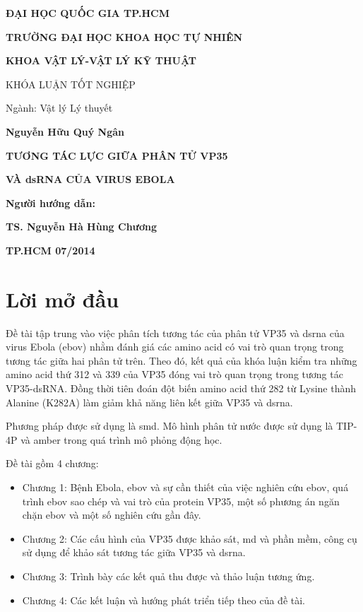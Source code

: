 \documentclass[12pt,a4paper,reqno, oneside]{book}
\begin{document}
\newpage
\begin{titlepage}
\centerline{\bf ĐẠI HỌC QUỐC GIA TP.HCM}
\centerline{\bf TRƯỜNG ĐẠI HỌC KHOA HỌC TỰ NHIÊN}
\centerline{\bf KHOA VẬT LÝ-VẬT LÝ KỸ THUẬT}
\vspace*{1cm}
\centerline{KHÓA LUẬN TỐT NGHIỆP}
\centerline{Ngành: Vật lý Lý thuyết}
\vspace*{1cm}
\centerline{\bf Nguyễn Hữu Quý Ngân}
\vspace*{3cm}
\centerline{\Large\bf TƯƠNG TÁC LỰC GIỮA PHÂN TỬ VP35}
\vspace*{0.5cm}
\centerline{\Large\bf VÀ dsRNA CỦA VIRUS EBOLA}
\vspace*{4cm}
\centerline{\bf Người hướng dẫn: }
\centerline{\bf TS. Nguyễn Hà Hùng Chương}
\vfill
\centerline{\bf TP.HCM 07/2014}
\end{titlepage}

\pagestyle{plain}
%

\cleardoublepage%
\pagestyle{fancy}
\tableofcontents
\clearpage

\printglossaries
{}
\clearpage

\newpage
\pagestyle{fancy}
\listoffigures



\newpage
\pagestyle{fancy}
\setcounter{page}{1}
\setcounter{chapter}{-1}
\chapter{Lời mở đầu}
\hspace{20pt}
	Đề tài tập trung vào việc phân tích tương tác của phân tử VP35 và \gls{dsrna} của virus Ebola (\gls{ebov}) nhằm đánh giá các amino acid có vai trò quan trọng trong tương tác giữa hai phân tử trên. Theo đó, kết quả của khóa luận kiểm tra những amino acid thứ 312 và 339 của VP35 đóng vai trò quan trọng trong tương tác VP35-dsRNA\cite{Leung2010}. Đồng thời tiên đoán đột biến amino acid thứ 282 từ Lysine thành Alanine (K282A) làm giảm khả năng liên kết giữa VP35 và \gls{dsrna}.
	
	Phương pháp được sử dụng là \gls{smd}. Mô hình phân tử nước được sử dụng là TIP-4P\cite{Horn2004} và \gls{amber}\cite{} trong quá trình mô phỏng động học.
	
	Đề tài gồm 4 chương:
	\begin{itemize}
	\item Chương 1: Bệnh Ebola, \gls{ebov} và sự cần thiết của việc nghiên cứu \gls{ebov}, quá trình \gls{ebov} sao chép và vai trò của protein VP35, một số phương án ngăn chặn \gls{ebov} và một số nghiên cứu gần đây.
	\item Chương 2: Các cấu hình của VP35 được khảo sát, \gls{md} và phần mềm, công cụ sử dụng để khảo sát tương tác giữa VP35 và \gls{dsrna}.
	\item Chương 3: Trình bày các kết quả thu được và thảo luận tương ứng.
	\item Chương 4: Các kết luận và hướng phát triển tiếp theo của đề tài.
	\end{itemize}
\end{document}
